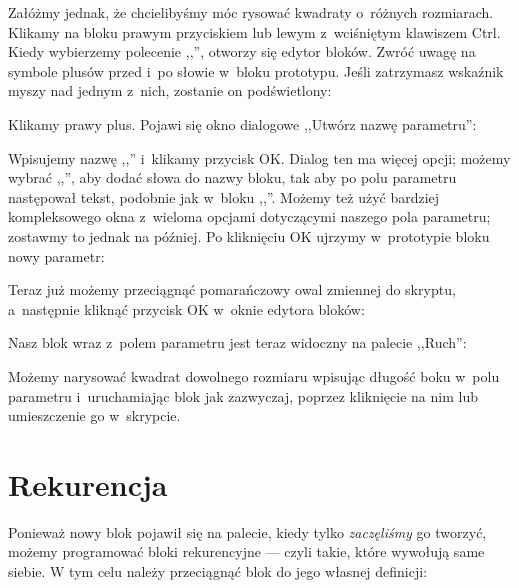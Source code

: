 \documentclass[a4paper]{report}
\begin{document}
Załóżmy jednak, że chcielibyśmy móc rysować kwadraty o~różnych rozmiarach. Klikamy na bloku prawym przyciskiem lub lewym z~wciśniętym klawiszem Ctrl. Kiedy wybierzemy polecenie ,,'', otworzy się edytor bloków. Zwróć uwagę na symbole plusów przed i~po słowie  w~bloku prototypu. Jeśli zatrzymasz wskaźnik myszy nad jednym z~nich, zostanie on podświetlony:\nopagebreak


Klikamy prawy plus. Pojawi się okno dialogowe ,,Utwórz nazwę parametru'':\nopagebreak


Wpisujemy nazwę ,,'' i~klikamy przycisk OK. Dialog ten ma więcej opcji; możemy wybrać ,,'', aby dodać słowa do nazwy bloku, tak aby po polu parametru następował tekst, podobnie jak w~bloku ,,''. Możemy też użyć bardziej kompleksowego okna z~wieloma opcjami dotyczącymi naszego pola parametru; zostawmy to jednak na później. Po kliknięciu OK ujrzymy w~prototypie bloku nowy parametr:\nopagebreak


Teraz już możemy przeciągnąć pomarańczowy owal zmiennej do skryptu, a~następnie kliknąć przycisk OK w~oknie edytora bloków:\nopagebreak


Nasz blok wraz z~polem parametru jest teraz widoczny na palecie ,,Ruch'':\nopagebreak


Możemy narysować kwadrat dowolnego rozmiaru wpisując długość boku w~polu parametru i~uruchamiając blok jak zazwyczaj, poprzez kliknięcie na nim lub umieszczenie go w~skrypcie.

\section{Rekurencja}

Ponieważ nowy blok pojawił się na palecie, kiedy tylko \emph{zaczęliśmy} go tworzyć, możemy programować bloki rekurencyjne --- czyli takie, które wywołują same siebie. W tym celu należy przeciągnąć blok do jego własnej definicji:\nopagebreak
\end{document}
